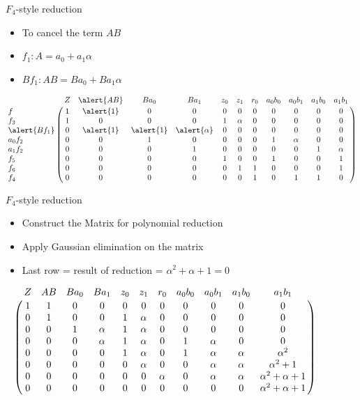\documentclass[xcolor=dvipsnames]{beamer}
\newcommand{\bi}{\begin{itemize}}
\newcommand{\ei}{\end{itemize}}
\begin{document}




\begin{frame}{\large{$F_4$-style reduction}}

\bi
\item To cancel the term \alert{$AB$}
\item $f_1: A = a_0 + a_1\alpha$ 
\item $Bf_1: AB = B a_0 + B a_1\alpha$
\ei

\begin{math}
\bordermatrix{
~ & Z  & \alert{AB} & Ba_0 & Ba_1 & z_0 & z_1 & r_0 & a_0b_0 & a_0b_1 & a_1b_0& a_1b_1\cr
{f} & {1} &\alert{1} &0 &0 &0 &0 &0 &0 &0 &0 &0\cr
{f_3} & {1} &0 &0 & 0 &{1} &{\alpha} &0 &0 &0 &0 &0 \cr
\alert{Bf_1} & 0 &\alert{1} &\alert{1} &\alert{\alpha} &0 &0 &0 &0 &0 &0 &0\cr
a_0f_2 &0  &0 &1 &0 &0 & 0& 0&1 &\alpha &0 &0\cr
a_1f_2 &0  &0 &0 &1 &0 &0 &0 &0 &0 &1 &\alpha\cr
f_5  & 0 &0 &0 &0 &1 &0 &0 &1 &0 &0 &1\cr
f_6  & 0 &0 &0 &0 &0 &1 &1 &0 &0 &0 &1\cr
f_4 & 0 &0 &0 &0 &0 &0 &1 &0 &1 &1 &0\cr
}
\end{math}

\end{frame}



\begin{frame}{\large{$F_4$-style reduction}}

\bi
\item Construct the Matrix for polynomial reduction
\item Apply Gaussian elimination on the matrix
\item Last row = result of reduction = $\alpha^2 + \alpha + 1 = 0$
\ei


\begin{math}
\bordermatrix{
~ & Z  & AB & Ba_0 & Ba_1 & z_0 & z_1 & r_0 & a_0b_0 & a_0b_1 & a_1b_0& a_1b_1\cr
& 1 &1 &0 &0 &0 &0 &0 &0 &0 &0 &0\cr
& 0 &1 &0 & 0 &1 &\alpha &0 &0 &0 &0 &0 \cr
& 0 &0 &1 &\alpha &1 &\alpha &0 &0 &0 &0 &0\cr
&0  &0 &0 &\alpha &1 & \alpha& 0&1 &\alpha &0 &0\cr
&0  &0 &0 &0 &1 &\alpha &0 &1 &\alpha &\alpha &\alpha^2\cr
& 0 &0 &0 &0 &0 &\alpha &0 &0 &\alpha &\alpha &\alpha^2+1\cr
& 0 &0 &0 &0 &0 &0 &\alpha &0 &\alpha &\alpha &\alpha^2+\alpha+1\cr
& 0 &0 &0 &0 &0 &0 &0 &0 &0 &0 &\alpha^2+\alpha+1\cr
}
\end{math}


\end{frame}
\end{document}

